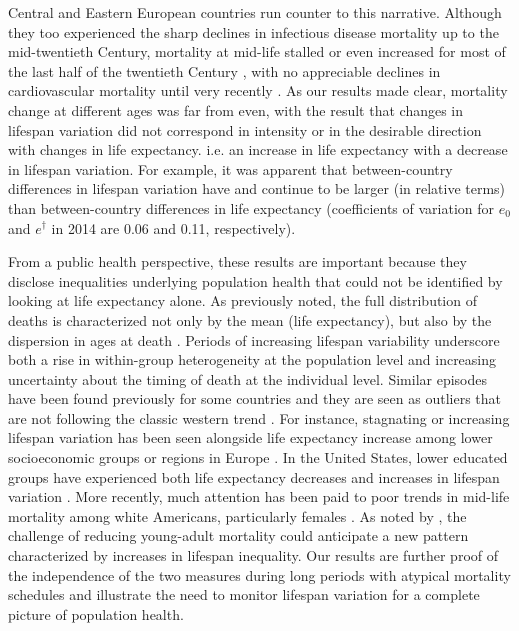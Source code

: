 \documentclass{article}
\begin{document}
\begin{spacing}{1.5}
Central and Eastern European countries run counter to this narrative. Although they too experienced the sharp declines in infectious disease mortality up to the mid-twentieth Century, mortality at mid-life stalled or even increased for most of the last half of the twentieth Century \citep{mckee2001}, with no appreciable declines in cardiovascular mortality until very recently \citep{caselli2002epidemiologic, grigoriev2014recent,mesle2004mortality,Timonin2017}. As our results made clear, mortality change at different ages was far from even, with the result that changes in lifespan variation did not correspond in intensity or in the desirable direction with changes in life expectancy. i.e. an increase in life expectancy with a decrease in lifespan variation. For example, it was apparent that between-country differences in lifespan variation have and continue to be larger (in relative terms) than between-country differences in life expectancy (coefficients of variation for $e_0$ and $e^\dagger$ in 2014 are 0.06 and 0.11, respectively). 

From a public health perspective, these results are important because they disclose inequalities underlying population health that could not be identified by looking at life expectancy alone. As previously noted, the full distribution of deaths is characterized not only by the mean (life expectancy), but also by the dispersion in ages at death \citep{edwards2005}. Periods of increasing lifespan variability underscore both a rise in within-group heterogeneity at the population level and increasing uncertainty about the timing of death at the individual level. Similar episodes have been found previously for some countries and they are seen as outliers that are not following the classic western trend \citep{wilmoth1999}. For instance, stagnating or increasing lifespan variation has been seen alongside life expectancy increase among lower socioeconomic groups or regions in Europe \citep{vanraalte2014,bronnum-hansen2017,seaman2016increasing}. In the United States, lower educated groups have experienced both life expectancy decreases and increases in lifespan variation \citep{sasson2016trends}. More recently, much attention has been paid to poor trends in mid-life mortality among white Americans, particularly females \citep{case2015rising,montez2013trends}. As noted by \citet{gillespie2014divergence}, the challenge of reducing young-adult mortality could anticipate a new pattern characterized by increases in lifespan inequality. Our results are further proof of the independence of the two measures during long periods with atypical mortality schedules and illustrate the need to monitor lifespan variation for a complete picture of population health.\\


\end{spacing}
\end{document}
